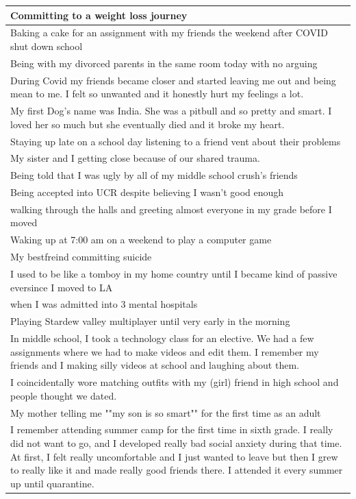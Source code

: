 \documentclass[
  .7em,
  letterpaper,
  DIV=11,
  numbers=noendperiod]{scrartcl}
\begin{document}
\begin{table}
\begin{tabular}{l}
\hline
Committing to a weight loss journey\\
\hline
Baking a cake for an assignment with my friends the weekend after COVID shut down school\\
\hline
Being with my divorced parents in the same room today with no arguing\\
\hline
During Covid my friends became closer and started leaving me out and being mean to me. I felt so unwanted and it honestly hurt my feelings a lot.\\
\hline
My first Dog's name was India. She was a pitbull and so pretty and smart. I loved her so much but she eventually died and it broke my heart.\\
\hline
Staying up late on a school day listening to a friend vent about their problems\\
\hline
My sister and I getting close because of our shared trauma.\\
\hline
Being told that I was ugly by all of my middle school crush's friends\\
\hline
Being accepted into UCR despite believing I wasn't good enough\\
\hline
walking through the halls and greeting almost everyone in my grade before I moved\\
\hline
Waking up at 7:00 am on a weekend to play a computer game\\
\hline
My bestfreind committing suicide\\
\hline
I used to be like a tomboy in my home country until I became kind of passive eversince I moved to LA\\
\hline
when I was admitted into 3 mental hospitals\\
\hline
Playing Stardew valley multiplayer until very early in the morning\\
\hline
In middle school, I took a technology class for an elective. We had a few assignments where we had to make videos and edit them. I remember my friends and I making silly videos at school and laughing about them.\\
\hline
I coincidentally wore matching outfits with my (girl) friend in high school and people thought we dated.\\
\hline
My mother telling me ""my son is so smart"" for the first time as an adult\\
\hline
I remember attending summer camp for the first time in sixth grade. I really did not want to go, and I developed really bad social anxiety during that time. At first, I felt really uncomfortable and I just wanted to leave but then I grew to really like it and made really good friends there. I attended it every summer up until quarantine.\\

\end{tabular}
\end{table}
\end{document}
